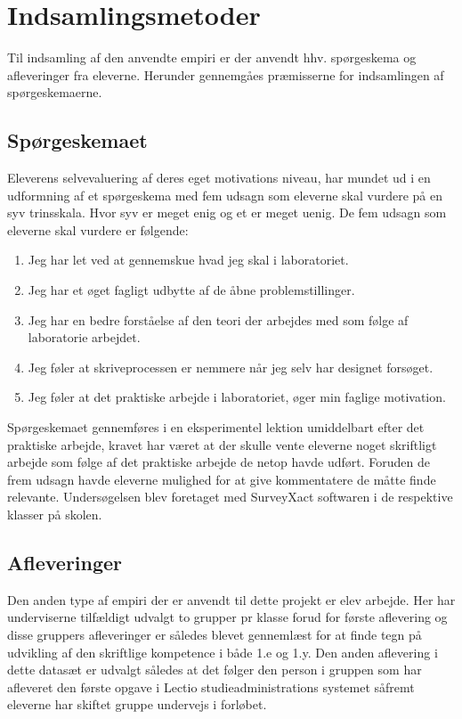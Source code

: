 \section{Indsamlingsmetoder}
\label{sec:ind}
Til indsamling af den anvendte empiri er der anvendt hhv. spørgeskema og afleveringer fra eleverne. Herunder gennemgåes præmisserne for indsamlingen af spørgeskemaerne.

\subsection*{Spørgeskemaet}
Eleverens selvevaluering af deres eget motivations niveau, har mundet ud i en udformning af et spørgeskema med fem udsagn som eleverne skal vurdere på en syv trinsskala. Hvor syv er meget enig og et er meget uenig. De fem udsagn som eleverne skal vurdere er følgende:
\begin{enumerate}
	\item Jeg har let ved at gennemskue hvad jeg skal i laboratoriet.\vspace{-15pt}
 	\item Jeg har et øget fagligt udbytte af de åbne problemstillinger.\vspace{-15pt}
	\item Jeg har en bedre forståelse af den teori der arbejdes med som følge af laboratorie arbejdet.\vspace{-15pt}
	\item Jeg føler at skriveprocessen er nemmere når jeg selv har designet forsøget.\vspace{-15pt}
	\item Jeg føler at det praktiske arbejde i laboratoriet, øger min faglige motivation.
\end{enumerate}
Spørgeskemaet gennemføres i en eksperimentel lektion umiddelbart efter det praktiske arbejde, kravet har været at der skulle vente eleverne noget skriftligt arbejde som følge af det praktiske arbejde de netop havde udført. Foruden de frem udsagn havde eleverne mulighed for at give kommentatere de måtte finde relevante. Undersøgelsen blev foretaget med SurveyXact softwaren i de respektive klasser på skolen.

\subsection*{Afleveringer}
Den anden type af empiri der er anvendt til dette projekt er elev arbejde. Her har underviserne tilfældigt udvalgt to grupper pr klasse forud for første aflevering og disse gruppers afleveringer er således blevet gennemlæst for at finde tegn på udvikling af den skriftlige kompetence i både 1.e og 1.y. Den anden aflevering i dette datasæt er udvalgt således at det følger den person i gruppen som har afleveret den første opgave i Lectio studieadministrations systemet såfremt eleverne har skiftet gruppe undervejs i forløbet. 

